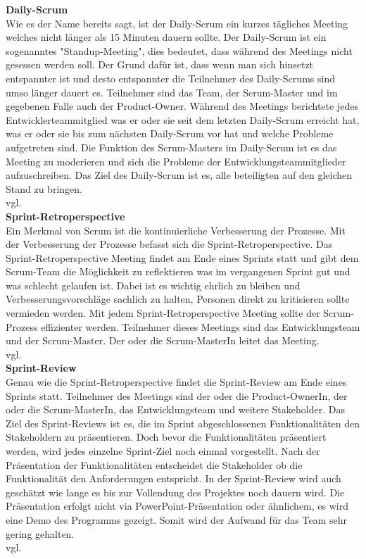 		\textbf{Daily-Scrum} \\
		Wie es der Name bereits sagt, ist der Daily-Scrum ein kurzes tägliches Meeting welches nicht länger als 15 Minuten dauern sollte. Der Daily-Scrum ist ein sogenanntes "Standup-Meeting", dies bedeutet, dass während des Meetings nicht gesessen werden soll. Der Grund dafür ist, dass wenn man sich hinsetzt entspannter ist und desto entspannter die Teilnehmer des Daily-Scrums sind umso länger dauert es. 
		Teilnehmer sind das Team, der Scrum-Master und im gegebenen Falle auch der Product-Owner. Während des Meetings berichtete jedes Entwicklerteammitglied was er oder sie seit dem letzten Daily-Scrum erreicht hat, was er oder sie bis zum nächsten Daily-Scrum vor hat und welche Probleme aufgetreten sind. Die Funktion des Scrum-Masters im Daily-Scrum ist es das Meeting zu moderieren und sich die Probleme der Entwicklungsteammitglieder aufzuschreiben.
		Das Ziel des Daily-Scrum ist es, alle beteiligten auf den gleichen Stand zu bringen.\\vgl. \textcite{ScrumDailyScrum} \\
		
		\textbf{Sprint-Retroperspective} \\
		Ein Merkmal von Scrum ist die kontinuierliche Verbesserung der Prozesse. Mit der Verbesserung der Prozesse befasst sich die Sprint-Retroperspective. Das Sprint-Retroperspective Meeting findet am Ende eines Sprints statt und gibt dem Scrum-Team die Möglichkeit zu reflektieren was im vergangenen Sprint gut und was schlecht gelaufen ist. Dabei ist es wichtig ehrlich zu bleiben und Verbesserungsvorschläge sachlich zu halten, Personen direkt zu kritisieren sollte vermieden werden. Mit jedem Sprint-Retroperspective Meeting sollte der Scrum-Prozess effizienter werden. 
		Teilnehmer dieses Meetings sind das Entwicklungsteam und der Scrum-Master. Der oder die Scrum-MasterIn leitet das Meeting.\\vgl. \textcite{ScrumScrum-Retroperspective} \\
		
		\textbf{Sprint-Review} \\
		Genau wie die Sprint-Retroperspective findet die Sprint-Review am Ende eines Sprints statt. Teilnehmer des Meetings sind der oder die Product-OwnerIn, der oder die Scrum-MasterIn, das Entwicklungsteam und weitere Stakeholder. Das Ziel des Sprint-Reviews ist es, die im Sprint abgeschlossenen Funktionalitäten den Stakeholdern zu präsentieren. Doch bevor die Funktionalitäten präsentiert werden, wird jedes einzelne Sprint-Ziel noch einmal vorgestellt. Nach der Präsentation der Funktionalitäten entscheidet die Stakeholder ob die Funktionalität den Anforderungen entspricht. In der Sprint-Review wird auch geschätzt wie lange es bis zur Vollendung des Projektes noch dauern wird.
		Die Präsentation erfolgt nicht via PowerPoint-Präsentation oder ähnlichem, es wird eine Demo des Programms gezeigt. Somit wird der Aufwand für das Team sehr gering gehalten.\\vgl.  \textcite{ScrumScrum-Review} \\
		
